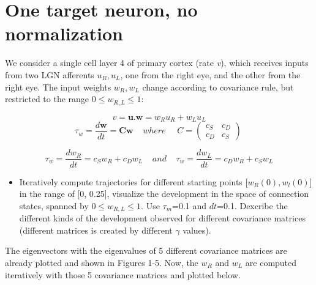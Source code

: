 \documentclass{article}
\begin{document}
\section{One target neuron, no normalization}
We consider a single cell layer 4 of primary cortex (rate \textit{v}), which receives inputs from two LGN afferents $u_R,u_L$, one from the right eye, and the other from the right eye. The input weights $w_R,w_L$ change according to covariance rule, but restricted to the range $0\leq w_{R,L} \leq 1$:

\begin{equation}
 v=\textbf{u.w}=w_R u_R + w_L u_L
\end{equation}
\begin{equation}
 \tau_w=\frac{d\textbf{w}}{dt}=\textbf{Cw} \;\;\;\; where \;\;\;\; \ C= \left ( \begin{array}{cc} c_S & c_D \\ c_D & c_S \end{array} \right ) \  
\end{equation}

\begin{equation*}
 \tau_w=\frac{dw_R}{dt}=c_S w_R + c_D w_L \;\;\;\; and \;\;\;\; \tau_w=\frac{dw_L}{dt}=c_D w_R + c_S w_L
\end{equation*}

\begin{itemize}
 \item Iteratively compute trajectories for different starting points [$w_R(0),w_l(0)$] in the range of [0, 0.25], visualize the development in the space of connection states, spanned by $0\leq w_{R,L} \leq 1$. Use $\tau_m$=0.1 and $dt$=0.1. Dexcribe the different kinds of the development observed for different covariance matrices (different matrices is created by different $\gamma$ values).
\end{itemize}

The eigenvectors with the eigenvalues of 5 different covariance matrices are already plotted and shown in Figures 1-5. Now, the $w_R$ and $w_L$ are computed iteratively with those 5 covariance matrices and plotted below. \newpage
\end{document}
